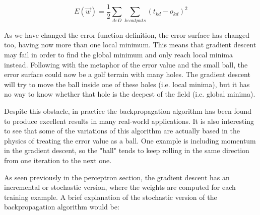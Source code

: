 		\begin{equation}
			\label{squared_error_function_network}
			E(\vec{w}) = \frac{1}{2} \sum_{d \varepsilon D} \sum_{k \varepsilon outputs} (t_{kd}-o_{kd})^2 
		\end{equation}

	As we have changed the error function definition, the error surface has changed too, having now more than one local minimum. This means that gradient descent may fail in order to find the global minimum and only reach local minima instead. Following with the metaphor of the error value and the small ball, the error surface could now be a golf terrain with many holes. The gradient descent will try to move the ball inside one of these holes (i.e. local minima), but it has no way to know whether that hole is the deepest of the field (i.e. global minima). 

	Despite this obstacle, in practice the backpropagation algorithm has been found to produce excellent results in many real-world applications. It is also interesting to see that some of the variations of this algorithm are actually based in the physics of treating the error value as a ball. One example is including momentum in the gradient descent, so the "ball" tends to keep rolling in the same direction from one iteration to the next one.

	As seen previously in the perceptron section, the gradient descent has an incremental or stochastic version, where the weights are computed for each training example. A brief explanation of the stochastic version of the backpropagation algorithm would be:

